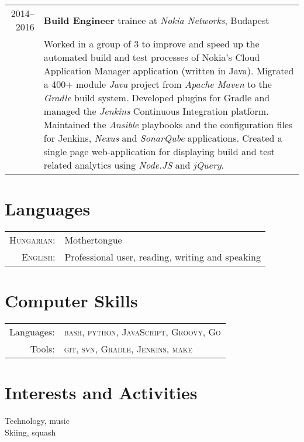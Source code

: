 \documentclass[a4paper,10pt]{article} %
\begin{document}
\begin{tabular}{r|p{12.5cm}}
\textsc{2014--2016} & \textbf{Build Engineer} trainee at \emph{Nokia Networks}, Budapest \\
& \footnotesize{Worked in a group of 3 to improve and speed up the automated build and test processes of Nokia’s Cloud Application Manager application (written in Java).
Migrated a 400+ module \emph{Java} project from \emph{Apache Maven} to the \emph{Gradle} build system. Developed plugins for Gradle and managed the \emph{Jenkins} Continuous Integration platform. Maintained the \emph{Ansible} playbooks and the configuration files for Jenkins, \emph{Nexus} and \emph{SonarQube} applications. Created a single page web-application for displaying build and test related analytics using \emph{Node.JS} and \emph{jQuery}.}\\



\end{tabular}


\section{Languages}
\begin{tabular}{rl}
\textsc{Hungarian:} & Mothertongue\\
\textsc{English:} &  Professional user, reading, writing and speaking\\
\end{tabular}


\section{Computer Skills}
\begin{tabular}{rl}
Languages: & \textsc{bash}, \textsc{python}, \textsc{JavaScript}, \textsc{Groovy}, \textsc{Go} \\
Tools: &  \textsc{git}, \textsc{svn}, \textsc{Gradle}, \textsc{Jenkins}, \textsc{make}
\end{tabular}


\section{Interests and Activities}
Technology, music \\
Skiing, squash
\end{document}

